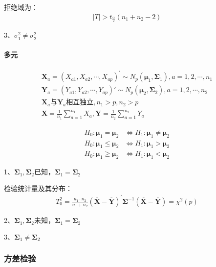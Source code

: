 \documentclass[12pt]{book}
\begin{document}
拒绝域为：
\begin{gather*}
    \left|T\right|>t_{\frac{\alpha}{2}}(n_1+n_2-2)
\end{gather*}


3、$\sigma_1^2\neq\sigma_2^2$














\paragraph{多元}


\begin{gather*}
    \mathbf{X}_{a}=(X_{a1},X_{a2},\cdots,X_{ap})^\prime \sim N_p(\bm{\mu}_1,\bm{\Sigma}_1), a=1,2,\cdots,n_1\\
    \bm{Y}_a=\left(Y_{a1},Y_{a2},\cdots,Y_{ap}\right)' \sim N_p(\bm{\mu}_2,\mathbf{\Sigma}_2), a=1,2,\cdots,n_2 \\
    \mathbf{X}_{a}与\mathbf{Y}_a\text{相互独立}, n_1>p, n_2>p\\
    \overline{\bm{X}}=\frac{1}{n_1}\sum_{a=1}^{n_1}{X_a}, \overline{\bm{Y}}=\frac{1}{n_2}\sum_{a=1}^{n_2}{Y_a}
\end{gather*}



\begin{align*}
    H_0:\bm{\mu}_1=\bm{\mu}_2    & \Leftrightarrow H_1:\bm{\mu}_1\neq\bm{\mu}_2 \\
    H_0:\bm{\mu}_1\le\bm{\mu}_2  & \Leftrightarrow  H_1:\bm{\mu}_1>\bm{\mu}_2   \\
    H_0:\bm{\mu}_1\geq\bm{\mu}_2 & \Leftrightarrow H_1:\bm{\mu}_1<\bm{\mu}_2
\end{align*}


1、$\bm{\Sigma}_1,\bm{\Sigma}_2$已知，$\bm{\Sigma}_1=\bm{\Sigma}_2$

检验统计量及其分布：
\begin{gather*}
    T_0^2 =\frac{n_1\cdot n_2}{n_1+n_2}\left(\overline{\bm{X}}-\overline{\bm{Y}}\right)^\prime\bm{\Sigma}^{-1}\left(\overline{\bm{X}}-\overline{\bm{Y}}\right)=\chi^2\left(p\right)
\end{gather*}

2、$\bm{\Sigma}_1,\bm{\Sigma}_2$未知，$\bm{\Sigma}_1=\bm{\Sigma}_2$

3、$\bm{\Sigma}_1\neq\bm{\Sigma}_2$

\subsubsection{方差检验}
\end{document}
